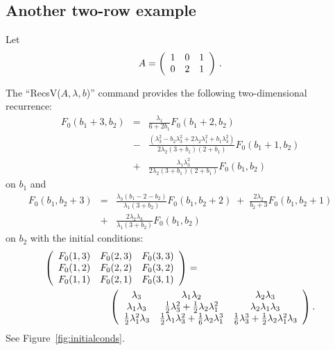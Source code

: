 \documentclass[11pt]{article}
\newcommand{\be}[1]{\begin{equation}\label{#1}}
\newcommand{\ee}{\end{equation}}
\newcommand{\beqn}{\begin{eqnarray*}}
\newcommand{\eeqn}{\end{eqnarray*}}
\newcommand{\oneh}{\frac{1}{2}}
\newcommand{\ones}{\frac{1}{6}}
\newcommand{\mypmatrix}[1]{\left(\begin{array}{cccccccccccc}#1\end{array}\right)}
\begin{document}
\subsection{Another two-row example}

Let
\be{eqn:Awater}
A = \mypmatrix{1 & 0 & 1\cr
               0 & 2 & 1}\,.
\ee

The ``RecsV($A, \lambda , b$)'' command provides the following two-dimensional
recurrence:
\beqn
F_0(b_1+3,b_2)
&=&
\frac{\lambda _1}{6+2b_1}F_0(b_1+2, b_2)\\
&-&
\frac{(\lambda _3^2-b_2 \lambda _3^2+2 \lambda _2 \lambda _1^2+b_1 \lambda _3^2) }{2\lambda _2(3+b_1) (2+b_1)}F_0(b_1+1,b_2)\\
&+&\frac{\lambda _1\lambda _3^2}{2\lambda _2(3+b_1)(2+b_1)}F_0(b_1, b_2)
\eeqn
on $b_1$ and
\beqn
F_0(b_1,b_2+3) &=&
\frac{\lambda _3(b_1-2-b_2)}{\lambda _1(3+b_2)}F_0(b_1, b_2+2)
\;+\;\frac{2\lambda _2}{b_2+3}F_0(b_1, b_2+1)\\
&+&\frac{2\lambda _2\lambda _3}{\lambda _1(3+b_2)}F_0(b_1, b_2)
\eeqn
on $b_2$
with the initial conditions:
\beqn
\mypmatrix{
F_0(1,3) & F_0(2,3) & F_0(3,3)\cr
F_0(1,2) & F_0(2,2) & F_0(3,2)\cr
F_0(1,1) & F_0(2,1) & F_0(3,1)}
&=&
\\
&&
\hspace{-100pt}
\mypmatrix{
\lambda _3& \lambda _1\lambda _2& \lambda _2\lambda _3\cr
\lambda _1\lambda _3& \oneh\lambda _3^2+\oneh\lambda _2\lambda _1^2&    \lambda _2\lambda _1\lambda _3\cr
\oneh\lambda _1^2\lambda _3& \oneh\lambda _1\lambda _3^2+\ones\lambda _2\lambda _1^3& \ones\lambda _3^3+\oneh\lambda _2\lambda _1^2\lambda _3
}.
\eeqn
See Figure~\ref{fig:initialconds}.
\end{document}
